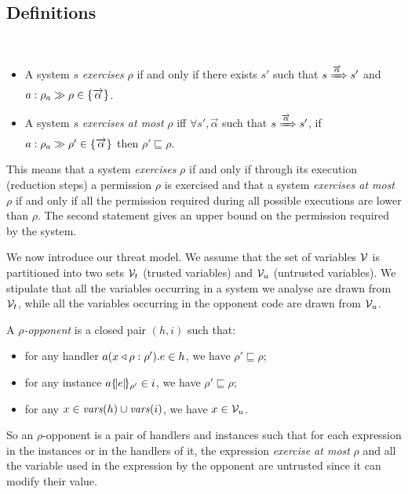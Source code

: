 \subsection{Definitions}
\begin{definition}[Exercise]
\label{def:exercise}
\mbox{ }
\begin{itemize}
\item A system $s$ \emph{exercises} $\rho$ if and only if there exists
  $s'$ such that $s \xRa{\vec{\alpha}} s'$ and $\labex{a}{\rho_a}{\rho} \in
  \{\vec{\alpha}\}$. 
\item A system $s$ \emph{exercises at most} $\rho$ iff
$\forall s',\vec{\alpha}$ such that $s\xRa{\vec{\alpha}}s'$, if
$\labex{a}{\rho_a}{\rho'}\in \{\vec{\alpha}\}$ then $\rho'\sqsubseteq\rho$.
\end{itemize}
\end{definition}
This means that a system \emph{exercises} $\rho$ if and only if through its execution (reduction steps) a permission $\rho$ is exercised and that a system \emph{exercises at most} $\rho$ if and only if all the permission required during all possible executions are lower than $\rho$. The second statement gives an upper bound on the permission required by the system.


We now introduce our threat model. We assume that the set of variables $\vars$ is partitioned into two sets $\vars_t$ (trusted variables) and $\vars_u$ (untrusted variables). We stipulate that all the variables occurring in a system we analyse are drawn from $\vars_t$, while all the variables occurring in the opponent code are drawn from $\vars_u$.

\begin{definition}[Opponent]
\label{def:opponent}
A \emph{$\rho$-opponent} is a closed pair $(h,i)$ such that:
\begin{itemize}
\item for any handler $\handler{a}{x}{\rho}{e}{\rho'} \in h$, we have $\rho' \sqsubseteq \rho$;
\item for any instance $\inst{a}{e}{\rho'} \in i$, we have $\rho' \sqsubseteq \rho$;
\item for any $x \in \fvbv(h) \cup \fvbv(i)$, we have $x \in \vars_u$.
\end{itemize}
\end{definition}
So an $\rho$-opponent is a pair of handlers and instances such that for each expression in the instances or in the handlers of it, the expression \emph{exercise at most} $\rho$ and all the variable used in the expression by the opponent are untrusted since it can modify their value.

